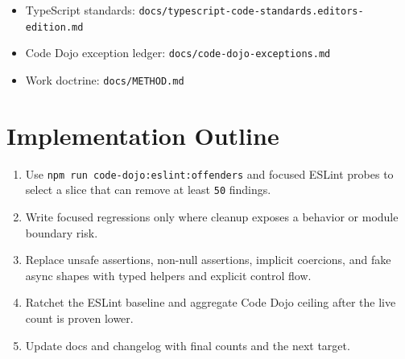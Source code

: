 \begin{itemize}
\tightlist
\item
  TypeScript standards: \texttt{d\allowbreak{}o\allowbreak{}c\allowbreak{}s\allowbreak{}/\allowbreak{}t\allowbreak{}y\allowbreak{}p\allowbreak{}e\allowbreak{}s\allowbreak{}c\allowbreak{}r\allowbreak{}i\allowbreak{}p\allowbreak{}t\allowbreak{}-\allowbreak{}c\allowbreak{}o\allowbreak{}d\allowbreak{}e\allowbreak{}-\allowbreak{}s\allowbreak{}t\allowbreak{}a\allowbreak{}n\allowbreak{}d\allowbreak{}a\allowbreak{}r\allowbreak{}d\allowbreak{}s\allowbreak{}.\allowbreak{}e\allowbreak{}d\allowbreak{}i\allowbreak{}t\allowbreak{}o\allowbreak{}r\allowbreak{}s\allowbreak{}-\allowbreak{}e\allowbreak{}d\allowbreak{}i\allowbreak{}t\allowbreak{}i\allowbreak{}o\allowbreak{}n\allowbreak{}.\allowbreak{}m\allowbreak{}d}
\item
  Code Dojo exception ledger: \texttt{d\allowbreak{}o\allowbreak{}c\allowbreak{}s\allowbreak{}/\allowbreak{}c\allowbreak{}o\allowbreak{}d\allowbreak{}e\allowbreak{}-\allowbreak{}d\allowbreak{}o\allowbreak{}j\allowbreak{}o\allowbreak{}-\allowbreak{}e\allowbreak{}x\allowbreak{}c\allowbreak{}e\allowbreak{}p\allowbreak{}t\allowbreak{}i\allowbreak{}o\allowbreak{}n\allowbreak{}s\allowbreak{}.\allowbreak{}m\allowbreak{}d}
\item
  Work doctrine: \texttt{d\allowbreak{}o\allowbreak{}c\allowbreak{}s\allowbreak{}/\allowbreak{}M\allowbreak{}E\allowbreak{}T\allowbreak{}H\allowbreak{}O\allowbreak{}D\allowbreak{}.\allowbreak{}m\allowbreak{}d}
\end{itemize}

\section{Implementation Outline}\label{record-232-implementation-outline}

\begin{enumerate}
\def\labelenumi{\arabic{enumi}.}
\tightlist
\item
  Use \texttt{n\allowbreak{}p\allowbreak{}m\allowbreak{} \allowbreak{}r\allowbreak{}u\allowbreak{}n\allowbreak{} \allowbreak{}c\allowbreak{}o\allowbreak{}d\allowbreak{}e\allowbreak{}-\allowbreak{}d\allowbreak{}o\allowbreak{}j\allowbreak{}o\allowbreak{}:\allowbreak{}e\allowbreak{}s\allowbreak{}l\allowbreak{}i\allowbreak{}n\allowbreak{}t\allowbreak{}:\allowbreak{}o\allowbreak{}f\allowbreak{}f\allowbreak{}e\allowbreak{}n\allowbreak{}d\allowbreak{}e\allowbreak{}r\allowbreak{}s} and focused ESLint probes to select a slice that can remove at least \texttt{5\allowbreak{}0} findings.
\item
  Write focused regressions only where cleanup exposes a behavior or module boundary risk.
\item
  Replace unsafe assertions, non-null assertions, implicit coercions, and fake async shapes with typed helpers and explicit control flow.
\item
  Ratchet the ESLint baseline and aggregate Code Dojo ceiling after the live count is proven lower.
\item
  Update docs and changelog with final counts and the next target.
\end{enumerate}

